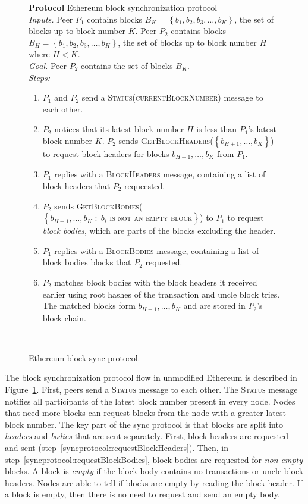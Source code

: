 \documentclass[12pt]{article}
\makeatletter
\newcounter{protocol}
\newenvironment{protocol}[1]
  {\par\addvspace{\topsep}
   \noindent
   \tabularx{\linewidth}{@{} X @{}}
    \hline
    \refstepcounter{protocol}\textbf{Protocol \theprotocol} #1 \\
    \hline}
  { \\
    \hline
   \endtabularx
   \par\addvspace{\topsep}}
\newcommand{\sbline}{\\[.5\normalbaselineskip]}%
\newcommand{\set}[1]{\left\{#1\right\}}
\newcommand{\setc}[2]{\left\{#1 \; :\; #2 \right\}}
\makeatother
\begin{document}
\begin{figure}[H]
  \begin{protocol}{Ethereum block synchronization protocol}
    \emph{Inputs.} Peer $P_1$ contains blocks $B_K = \set{b_{1}, b_{2}, b_{3}, \ldots, b_{K}}$, the set of blocks up to block number $K$. Peer $P_2$ contains blocks $B_H = \set{b_{1}, b_{2}, b_{3}, \ldots, b_{H}}$, the set of blocks up to block number $H$ where $H < K$.
    \sbline
    \emph{Goal.} Peer $P_2$ contains the set of blocks $B_K$.
    \sbline
    \emph{Steps:}
    \begin{enumerate}
      \item $P_1$ and $P_2$ send a \textsc{Status(currentBlockNumber)} message to each other.
      \item $P_2$ notices that its latest block number $H$ is less than $P_1$'s latest block number $K$. $P_2$ sends \textsc{GetBlockHeaders($\set{b_{H+1}, \ldots, b_{K}}$)} to request block headers for blocks $b_{H + 1}, \ldots, b_{K}$ from $P_1$. \label{syncprotocol:requestBlockHeaders}
      \item $P_1$ replies with a \textsc{BlockHeaders} message, containing a list of block headers that $P_2$ requeested. \label{syncprotocol:replyBlockHeaders}
      \item $P_2$ sends \textsc{GetBlockBodies($\setc{b_{H+1}, \ldots, b_{K}}{\text{$b_i$ is not an empty block}}$)} to $P_1$ to request \emph{block bodies}, which are parts of the blocks excluding the header. \label{syncprotocol:requestBlockBodies}
      \item $P_1$ replies with a \textsc{BlockBodies} message, containing a list of block bodies blocks that $P_2$ requested. \label{syncprotocol:replyBlockBodies}
      \item $P_2$ matches block bodies with the block headers it received earlier using root hashes of the transaction and uncle block tries. The matched blocks form $b_{H + 1}, \ldots, b_{K}$ and are stored in $P_2$'s block chain. \label{syncprotocol:reconstruct}
    \end{enumerate}
  \end{protocol}
  \caption{Ethereum block sync protocol.} \label{syncprotocol}
\end{figure}


The block synchronization protocol flow in unmodified Ethereum is described in Figure~\ref{syncprotocol}. First, peers send a \textsc{Status} message to each other. The \textsc{Status} message notifies all participants of the latest block number present in every node. Nodes that need more blocks can request blocks from the node with a greater latest block number. The key part of the sync protocol is that blocks are split into \emph{headers} and \emph{bodies} that are sent separately. First, block headers are requested and sent (step~\ref{syncprotocol:requestBlockHeaders}). Then, in step~\ref{syncprotocol:requestBlockBodies}, block bodies are requested for \emph{non-empty} blocks. A block is \emph{empty} if the block body contains no transactions or uncle block headers. Nodes are able to tell if blocks are empty by reading the block header. If a block is empty, then there is no need to request and send an empty body.
\end{document}
